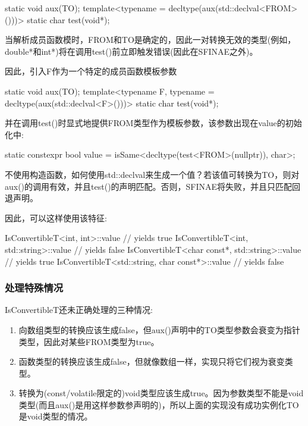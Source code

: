 \begin{cpp}
static void aux(TO);
template<typename = decltype(aux(std::declval<FROM>()))>
	static char test(void*);
\end{cpp}

当解析成员函数模时，FROM和TO是确定的，因此一对转换无效的类型(例如，double*和int*)将在调用test()前立即触发错误(因此在SFINAE之外)。

因此，引入F作为一个特定的成员函数模板参数

\begin{cpp}
static void aux(TO);
template<typename F, typename = decltype(aux(std::declval<F>()))>
	static char test(void*);
\end{cpp}

并在调用test()时显式地提供FROM类型作为模板参数，该参数出现在value的初始化中:

\begin{cpp}
static constexpr bool value
	= isSame<decltype(test<FROM>(nullptr)), char>;
\end{cpp}

不使用构造函数，如何使用std::declval来生成一个值？若该值可转换为TO，则对aux()的调用有效，并且test()的声明匹配。否则，SFINAE将失败，并且只匹配回退声明。

因此，可以这样使用该特征:

\begin{cpp}
IsConvertibleT<int, int>::value // yields true
IsConvertibleT<int, std::string>::value // yields false
IsConvertibleT<char const*, std::string>::value // yields true
IsConvertibleT<std::string, char const*>::value // yields false
\end{cpp}

\subsubsection{处理特殊情况}

IsConvertibleT还未正确处理的三种情况:

\begin{enumerate}
\item
向数组类型的转换应该生成false，但aux()声明中的TO类型参数会衰变为指针类型，因此对某些FROM类型为true。

\item
函数类型的转换应该生成false，但就像数组一样，实现只将它们视为衰变类型。

\item
转换为(const/volatile限定的)void类型应该生成true。因为参数类型不能是void类型(而且aux()是用这样参数参声明的)，所以上面的实现没有成功实例化TO是void类型的情况。
\end{enumerate}

